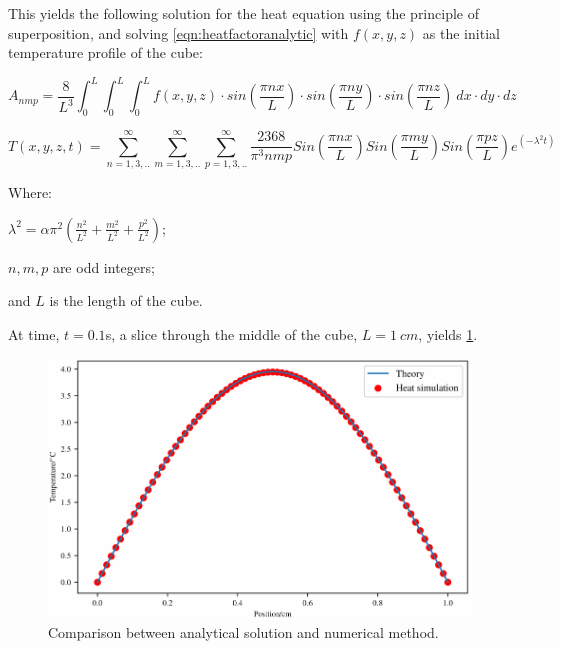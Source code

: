 This yields the following solution for the heat equation using the principle of superposition, and solving \cref{eqn:heatfactoranalytic} with $f(x,y,z)$ as the initial temperature profile of the cube:

\begin{equation}
A_{nmp}=\frac{8}{L^3}\int_0^L\int_0^L\int_0^L f(x,y,z)\cdot sin(\frac{\pi n x}{L})\cdot sin(\frac{\pi n y}{L})\cdot sin(\frac{\pi n z}{L})\ dx\cdot dy\cdot dz
\label{eqn:heatfactoranalytic}
\end{equation}

\begin{equation}
T(x,y,z,t)=\sum^\infty_{n=1,3,..}\sum^\infty_{m=1,3,..}\sum^\infty_{p=1,3,..}\frac{2368}{\pi^3nmp}Sin(\frac{\pi n x}{L})Sin(\frac{\pi m y}{L})Sin(\frac{\pi p z}{L})e^{(-\lambda^2t)}
\end{equation}

\noindent Where:

	\indent $\lambda^2=\alpha\pi^2(\tfrac{n^2}{L^2}+\tfrac{m^2}{L^2}+\tfrac{p^2}{L^2})$;
	
	\indent $n,m,p$ are odd integers;
	
	\indent and $L$ is the length of the cube.
	
	\medskip
	
At time, $t=0.1$s, a slice through the middle of the cube, $L=1~cm$,  yields \cref{fig:validation-heat}.

\begin{figure}	
\vspace{-10pt}
	\centering
	\includegraphics[width=\columnwidth]{./ablation/images/validation.pdf}
	\caption{Comparison between analytical solution and numerical method.}
	\label{fig:validation-heat}
	\vspace{-10pt}
\end{figure}	

